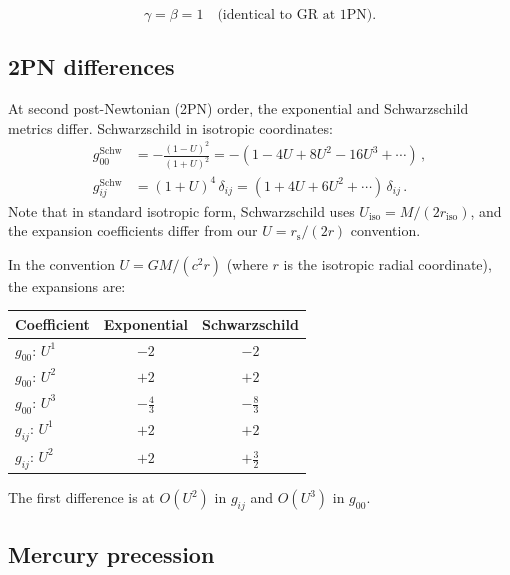\documentclass[aps,prd,preprint,superscriptaddress,longbibliography]{revtex4-2}
\newcommand{\rs}{r_{\mathrm{s}}}
\begin{document}
\begin{equation}
  \boxed{\gamma = \beta = 1 \quad\text{(identical to GR at 1PN).}}
  \label{eq:PPN_result}
\end{equation}

\subsection{2PN differences}

At second post-Newtonian (2PN) order, the exponential and
Schwarzschild metrics differ.  Schwarzschild in isotropic coordinates:
\begin{align}
  g_{00}^{\mathrm{Schw}} &= -\frac{(1-U)^2}{(1+U)^2}
  = -(1 - 4U + 8U^2 - 16U^3 + \cdots)\,,
  \label{eq:g00_Schw_iso}\\
  g_{ij}^{\mathrm{Schw}} &= (1+U)^4\,\delta_{ij}
  = (1 + 4U + 6U^2 + \cdots)\,\delta_{ij}\,.
  \label{eq:gij_Schw_iso}
\end{align}
Note that in standard isotropic form, Schwarzschild uses
$U_{\mathrm{iso}} = M/(2r_{\mathrm{iso}})$, and the expansion
coefficients differ from our $U = \rs/(2r)$ convention.

In the convention $U = GM/(c^2 r)$ (where $r$ is the isotropic radial
coordinate), the expansions are:
\begin{center}
\begin{tabular}{lcc}
\toprule
\textbf{Coefficient} & \textbf{Exponential} & \textbf{Schwarzschild} \\
\midrule
$g_{00}$: $U^1$ & $-2$ & $-2$ \\
$g_{00}$: $U^2$ & $+2$ & $+2$ \\
$g_{00}$: $U^3$ & $-\frac{4}{3}$ & $-\frac{8}{3}$ \\
$g_{ij}$: $U^1$ & $+2$ & $+2$ \\
$g_{ij}$: $U^2$ & $+2$ & $+\frac{3}{2}$ \\
\bottomrule
\end{tabular}
\end{center}
The first difference is at $O(U^2)$ in $g_{ij}$ and $O(U^3)$ in $g_{00}$.

\subsection{Mercury precession}
\end{document}
